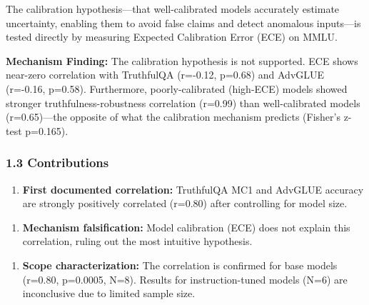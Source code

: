 The calibration hypothesis---that well-calibrated models accurately estimate uncertainty, enabling them to avoid false claims and detect anomalous inputs---is tested directly by measuring Expected Calibration Error (ECE) on MMLU.

\textbf{Mechanism Finding:} The calibration hypothesis is not supported. ECE shows near-zero correlation with TruthfulQA (r=-0.12, p=0.68) and AdvGLUE (r=-0.16, p=0.58). Furthermore, poorly-calibrated (high-ECE) models showed stronger truthfulness-robustness correlation (r=0.99) than well-calibrated models (r=0.65)---the opposite of what the calibration mechanism predicts (Fisher's z-test p=0.165).

\subsubsection{1.3 Contributions}

\begin{enumerate}
\item \textbf{First documented correlation:} TruthfulQA MC1 and AdvGLUE accuracy are strongly positively correlated (r=0.80) after controlling for model size.
\end{enumerate}

\begin{enumerate}
\item \textbf{Mechanism falsification:} Model calibration (ECE) does not explain this correlation, ruling out the most intuitive hypothesis.
\end{enumerate}

\begin{enumerate}
\item \textbf{Scope characterization:} The correlation is confirmed for base models (r=0.80, p=0.0005, N=8). Results for instruction-tuned models (N=6) are inconclusive due to limited sample size.
\end{enumerate}
